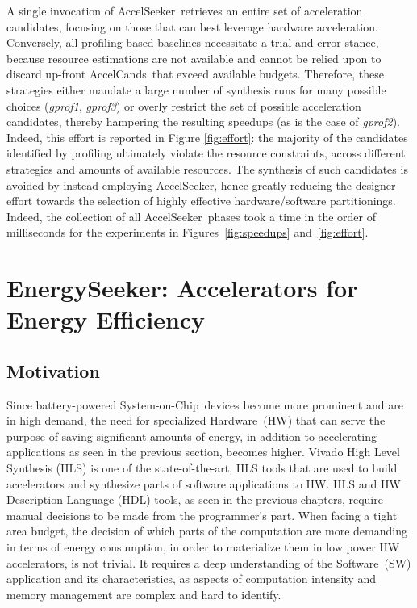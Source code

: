 \documentclass[]{usiinfthesis}
\newcommand{\aseeker}{{AccelSeeker}}
\newcommand{\HW}{{Hardware}}
\newcommand{\SW}{{Software}}
\newcommand{\SoC}{{System-on-Chip}}
\newcommand{\candidates}{{AccelCand}s}
\begin{document}
A single invocation of \aseeker\ retrieves an entire set of
acceleration candidates, focusing on those that can best leverage
hardware acceleration.  Conversely, all profiling-based baselines
necessitate a trial-and-error stance, because resource estimations are
not available and cannot be relied upon to discard up-front
\candidates\ that exceed available budgets.  Therefore, these
strategies either mandate a large number of synthesis runs for many
possible choices (\emph{gprof1}, \emph{gprof3}) or overly restrict the
set of possible acceleration candidates, thereby hampering the
resulting speedups (as is the case of \emph{gprof2}).  Indeed, this
effort is reported in Figure \ref{fig:effort}: the majority of the
candidates identified by profiling ultimately violate the resource
constraints, across different strategies and amounts of available
resources. The synthesis of such candidates is avoided by instead
employing \aseeker, hence greatly reducing the designer effort towards
the selection of highly effective hardware/software partitionings.
Indeed, the collection of all \aseeker\ phases took a time in the
order of milliseconds for the experiments in
Figures~\ref{fig:speedups} and~\ref{fig:effort}.

% 
%
%
%
%

\section{EnergySeeker: Accelerators for Energy Efficiency}

\subsection{Motivation}

Since battery-powered \SoC\ devices become more prominent and are in high demand, the need
for specialized \HW\ (HW) that can serve the purpose of 
saving significant amounts of energy, in addition to accelerating applications as seen 
in the previous section, becomes higher. 
Vivado High Level Synthesis (HLS) 
\cite{VivadoHLSMar17} is one of the state-of-the-art, HLS tools that are used to 
build accelerators and synthesize parts of software applications to HW. 
HLS and HW Description Language (HDL) tools, as seen in the previous chapters, require 
manual decisions to be made from the programmer's part. 
When 
facing a tight area budget, the decision of which parts of the computation are more
demanding in terms of energy consumption, in order to 
 materialize them in low power HW accelerators, is not 
trivial. It requires a deep understanding of the \SW\ (SW) application 
and its characteristics, as aspects of computation intensity and memory 
management are complex and hard to identify.\par
\end{document}
